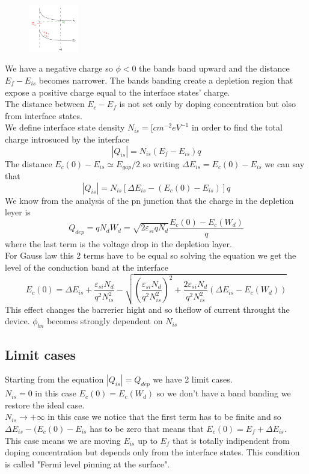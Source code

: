 \begin{figure}
\includegraphics[width=0.19\textwidth]{is02.png}
\end{figure}

We have a negative charge so $\phi<0$ the bands band upward and the distance $E_f-E_{is}$ becomes narrower. The bands banding create a depletion region that expose a positive charge equal to the interface states' charge.\\
The distance between $E_c-E_f$ is not set only by doping concentration but olso from interface states.\\
We define interface state density $N_{is} = [cm^{-2}eV^{-1}$ in order to find the total charge introsuced by the interface 
\begin{equation}
|Q_{is}|=N_{is}(E_f-E_{is})q
\end{equation}
The distance $E_c(0)-E_{is}\simeq E_{gap}/2$ so writing $\Delta E_{is}=E_c(0)-E_{is}$ we can say that
\begin{equation}
|Q_{is}|=N_{is}[\Delta E_{is}-(E_c(0)-E_{is})]q
\end{equation}
We know from the analysis of the pn junction that the charge in the depletion leyer is 
\begin{equation}
Q_{dep}=qN_dW_d=\sqrt{2\varepsilon_{si}qN_d}\frac{E_c(0)-E_c(W_d)}{q}
\end{equation}
where the last term is the voltage drop in the depletion layer.\\
For Gauss law this 2 terms have to be equal so solving the equation we get the level of the conduction band at the interface 
\begin{equation}
E_c(0)=\Delta E_{is}+\frac{\varepsilon_{si}N_d}{q^2N^2_{is}}-\sqrt{(\frac{\varepsilon_{si}N_d}{q^2N^2_{is}})^2+\frac{2\varepsilon_{si}N_d}{q^2N^2_{is}}(\Delta E_{is}-E_c(W_d))}
\end{equation}
This effect changes the barrerier hight and so theflow of current throught the device. $\phi_{bn}$ becomes strongly dependent on $N_{is}$

\subsection{Limit cases}
Starting from the equation $|Q_{is}|=Q_{dep}$ we have 2 limit cases.\\
$N_{is}=0$ in this case $E_c(0)=E_c(W_d)$ so we don't have a band banding we restore the ideal case.\\
$N_{is}\rightarrow +\infty$ in this case we notice that the first term has to be finite and so $\Delta E_{is}-(E_c(0)-E_{is}$ has to be zero that means that $E_c(0)=E_f+\Delta E_{is}$. \\
This case means we are moving $E_{is}$ up to $E_f$ that is totally indipendent from doping concentration but depends only from the interface states. This condition is called "Fermi level pinning at the surface".\\

